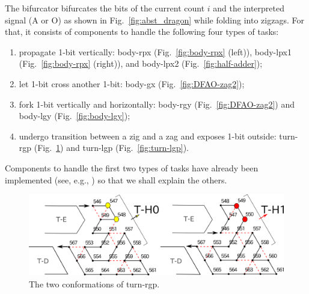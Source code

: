 The bifurcator bifurcates the bits of the current count $i$ and the interpreted signal (A or O) as shown in Fig.~\ref{fig:abst_dragon} while folding into zigzags.
For that, it consists of components to handle the following four types of tasks: 
\begin{enumerate}[itemsep=0pt]
\item propagate 1-bit vertically: body-rpx (Fig.~\ref{fig:body-rpx} (left)), body-lpx1 (Fig.~\ref{fig:body-rpx} (right)), and body-lpx2 (Fig.~\ref{fig:half-adder});
\item let 1-bit cross another 1-bit: body-gx (Fig.~\ref{fig:DFAO-zag2}); 
\item fork 1-bit vertically and horizontally: body-rgy (Fig.~\ref{fig:DFAO-zag2}) and body-lgy (Fig.~\ref{fig:body-lgy});  
\item undergo transition between a zig and a zag and exposes 1-bit outside: turn-rgp (Fig.~\ref{fig:turn-rgp}) and turn-lgp (Fig.~\ref{fig:turn-lgp}). 
\end{enumerate} 
Components to handle the first two types of tasks have already been implemented (see, e.g., \cite{HaKiOtSe2016}) so that we shall explain the others.


\begin{figure}
\vspace*{-5mm}
\centering
\includegraphics[width=\linewidth]{pic/turn-rgp.png}
\caption{The two conformations of turn-rgp.}
\label{fig:turn-rgp}
\vspace*{-5mm}
\end{figure}

